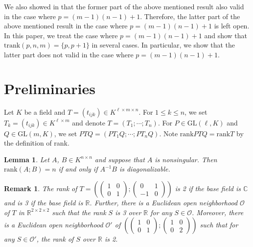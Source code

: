\documentclass[a4paper,12pt]{article}
\newcommand{\CCC}{\mathbb{C}}
\newcommand{\RRR}{\mathbb{R}}
\newcommand{\msOOO}{\mathscr{O}}
\newcommand{\rank}{\mathrm{rank}}
\newcommand{\glin}{{\mathrm{GL}}}
\newcommand\nonsing{nonsingular}
\newcommand{\trank}{{\mathrm{trank}}}
\newtheorem{lemma}[thm]{Lemma}
\newtheorem{remark}[thm]{Remark}
\begin{document}
We also showed in \cite{sms17} that the former part of the above mentioned result
also valid in the case
where $p=(m-1)(n-1)+1$.
Therefore, the latter part of the above mentioned result in
the case where $p=(m-1)(n-1)+1$ is left open.
In this paper, we treat the case where $p=(m-1)(n-1)+1$ and show that 
$\trank(p,n,m)=\{p,p+1\}$ in several cases.
In particular, we show that the latter part does not valid in the case
where $p=(m-1)(n-1)+1$.




\section{Preliminaries}


Let $K$ be a field and $T=(t_{ijk})\in K^{\ell\times m\times n}$.
For $1\leq k\leq n$, we set $T_k=(t_{ijk})\in K^{\ell\times m}$
and denote $T=(T_1;\cdots;T_n)$.
For $P\in \glin(\ell,K)$ and $Q\in \glin(m,K)$, we set
$PTQ=(PT_1Q;\cdots;PT_nQ)$.
Note $\rank PTQ=\rank T$
by the definition of rank.

\iffalse
\begin{lemma}
Let $A$, $B\in K^{n\times n}$ and suppose that $A$ is \nonsing.
Then $\rank(A;B)=n$ if and only if $A^{-1}B$ is diagonalizable.
\end{lemma}


\begin{remark}\rm
The rank of 
$T=\left(\begin{pmatrix}1&0\\0&1\end{pmatrix};
\begin{pmatrix}0&1\\-1&0\end{pmatrix}\right)$ is 2 if the base field is $\CCC$
and is 3 if the base field is $\RRR$.
Further, there is a Euclidean open neighborhood $\msOOO$ of $T$ in
$\RRR^{2\times 2\times 2}$ such that the rank $S$  is 3 over $\RRR$
for any $S\in\msOOO$.
Moreover, there is a Euclidean open neighborhood $\msOOO'$ of
$\left(\begin{pmatrix}1&0\\0&1\end{pmatrix};
\begin{pmatrix}1&0\\0&2\end{pmatrix}\right)$
such that for any $S\in\msOOO'$, the rank of $S$ over $\RRR$ is 2.
\end{remark}
\end{document}
